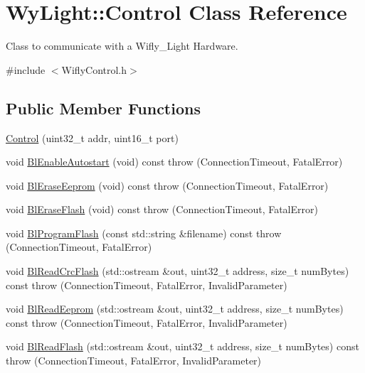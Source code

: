 \hypertarget{class_wy_light_1_1_control}{\section{Wy\-Light\-:\-:Control Class Reference}
\label{class_wy_light_1_1_control}
}


Class to communicate with a Wifly\-\_\-\-Light Hardware.  




{\ttfamily \#include $<$Wifly\-Control.\-h$>$}

\subsection*{Public Member Functions}
\begin{DoxyCompactItemize}
\item 
\hyperlink{class_wy_light_1_1_control_a2d5efc4402b12961aea578e1aeb91dab}{Control} (uint32\-\_\-t addr, uint16\-\_\-t port)
\item 
void \hyperlink{class_wy_light_1_1_control_a0198560d89e0af7c668ab182d4cd5533}{Bl\-Enable\-Autostart} (void) const   throw (\-Connection\-Timeout, Fatal\-Error)
\item 
void \hyperlink{class_wy_light_1_1_control_a90019ceb9f607dbb3401cfd393a1fe00}{Bl\-Erase\-Eeprom} (void) const   throw (\-Connection\-Timeout, Fatal\-Error)
\item 
void \hyperlink{class_wy_light_1_1_control_ae661b928eb3ddc85614fffb570234bb7}{Bl\-Erase\-Flash} (void) const   throw (\-Connection\-Timeout, Fatal\-Error)
\item 
void \hyperlink{class_wy_light_1_1_control_a8bef060b2d26d436f143784c74750a80}{Bl\-Program\-Flash} (const std\-::string \&filename) const   throw (\-Connection\-Timeout, Fatal\-Error)
\item 
void \hyperlink{class_wy_light_1_1_control_aefe6c849859c10b81620e1251a3acbd0}{Bl\-Read\-Crc\-Flash} (std\-::ostream \&out, uint32\-\_\-t address, size\-\_\-t num\-Bytes) const   throw (\-Connection\-Timeout, Fatal\-Error, Invalid\-Parameter)
\item 
void \hyperlink{class_wy_light_1_1_control_aadac9ad0d311360e2999414cb220c78f}{Bl\-Read\-Eeprom} (std\-::ostream \&out, uint32\-\_\-t address, size\-\_\-t num\-Bytes) const   throw (\-Connection\-Timeout, Fatal\-Error, Invalid\-Parameter)
\item 
void \hyperlink{class_wy_light_1_1_control_ab31a3e0c102ced985377314a3056e588}{Bl\-Read\-Flash} (std\-::ostream \&out, uint32\-\_\-t address, size\-\_\-t num\-Bytes) const   throw (\-Connection\-Timeout, Fatal\-Error, Invalid\-Parameter)

\end{DoxyCompactItemize}
